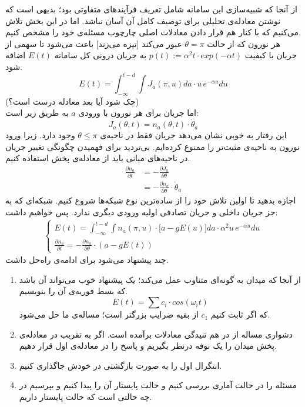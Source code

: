 \documentclass[12pt,onecolumn,a4paper]{article}
\begin{document}

از آنجا که شبیه‌سازی این سامانه شامل تعریف فرآیندهای متفاوتی بود؛ بدیهی است که نوشتن معادله‌ی تحلیلی برای توصیف کامل آن آسان نباشد. اما در این بخش تلاش می‌کنیم که با کنار هم قرار دادن معادلات اصلی چارچوب مسئله‌ی خود را مشخص کنیم.\\
هر نورون که از حالت $\theta = \pi$ عبور می‌کند [تیزه می‌زند] باعث می‌شود تا سهمی از جریان با کیفیت $p(t):= \alpha^2 t \cdot exp(-\alpha t)$ به جریان درونی کل سامانه $E(t)$ اضافه شود.
\begin{equation}
E(t) = \int_{- \infty}^{t - d} \int J_a (\pi,u) da \cdot u\, e^{-\alpha u} du
\end{equation}
(چک شود آیا بعد معادله درست است؟)\\
اما جریان برای هر نورون با ورودی $a$ به طریق زیر است:
\begin{equation}
J_a (\theta, t) = n_a(\theta,t) \cdot \dot \theta_a
\end{equation}
این رفتار به خوبی نشان می‌دهد جریان فقط در ناحیه‌ی $\theta \leq \pi$ وجود دارد. زیرا ورود نورون به ناحیه‌ی مثبت‌تر را ممنوع کرده‌ایم.  بی‌تردید برای فهمیدن چگونگی تغییر جریان در ناحیه‌های میانی باید از معادله‌ی پخش استفاده کنیم.
\begin{align}
\frac{\partial n_a}{\partial t} &= - \frac{\partial J_a}{\partial \theta}\\
&= - \frac{\partial n_a}{\partial \theta} \cdot \dot \theta_a
\end{align}
اجازه بدهید تا اولین تلاش خود را از ساده‌ترین نوع شبکه‌ها شروع کنیم. شبکه‌ای که به جز جریان داخلی و جریان تصادفی اولیه ورودی دیگری ندارد. پس خواهیم داشت:
\begin{align}
\begin{cases}
E(t) = \int_{- \infty}^{t - d} \int n_a(\pi,u) \cdot \big[ a - g E(u) \big] da \cdot \alpha^2 u\, e^{-\alpha u} du \\
\frac{\partial n_a}{\partial t} = - \frac{\partial n_a}{\partial \theta} \cdot (a - g E(t) )
\end{cases}
\label{eq:simple_network}
\end{align}
چند پیشنهاد می‌شود برای ادامه‌ی راه‌حل داشت.
\begin{enumerate}[1.]
\item
از آنجا که میدان به گونه‌ای متناوب عمل می‌کند؛ یک پیشنهاد خوب می‌تواند آن باشد که بسط فوریه‌ی آن را بنویسیم.
\begin{equation}
E(t) = \sum c_i \cdot cos(\omega_i t)
\end{equation}
که اگر ثابت کنیم $c_1$ از بقیه ضرایب بزرگتر است؛ مساله‌ی ما حل می‌شود.
\item
دشواری مساله از در هم تنیدگی معادلات برآمده است. اگر به تقریب در معادله‌ی پخش میدان را یک نوفه درنظر بگیریم و پاسخ را در معادله‌ی اول قرار دهیم.
\item
انتگرال اول را به صورت بازگشتی در خودش جاگذاری کنیم.
\item
مسئله را در حالت آماری بررسی کنیم و حالت پایستار آن را پیدا کنیم و  بپرسیم در چه حالتی است که حالت پایستار داریم.
\end{enumerate}
\end{document}
